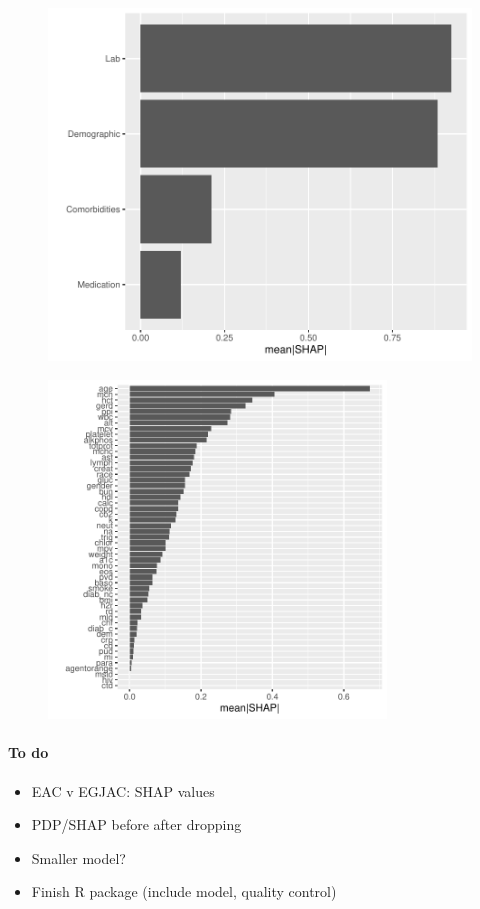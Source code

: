 \documentclass[12pt]{article}
\begin{document}
\begin{figure}[h]
\centering
\includegraphics[width=\textwidth]{figures/shap_category.pdf}
\end{figure}
\begin{figure}[h]
\centering
\includegraphics[width=0.8\textwidth]{figures/shap_groups.pdf}
\end{figure}

\clearpage
\paragraph*{To do}
\begin{itemize}
	\item EAC v EGJAC: SHAP values
	\item PDP/SHAP before after dropping
	\item Smaller model?
	\item Finish R package (include model, quality control)
\end{itemize}
\end{document}
